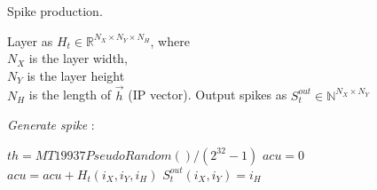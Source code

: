 \begin{algorithm}[h!]
	\label{alg:spike}
	\caption{Spike production.}
	
	\begin{algorithmic}[1]
		\SetAlgoLined
		\renewcommand{\algorithmicrequire}{\textbf{input:}}
		\renewcommand{\algorithmicensure}{\textbf{output:}}
		\REQUIRE Layer as $H_t\in\mathbb{R}^{N_X \times N_Y \times N_H}$, where\\
		$N_X$ is the layer width,\\
		$N_Y$ is the layer height\\
		$N_H$ is the length of $\vec{h}$ (IP vector).
		\ENSURE Output spikes as $S_t^{out} \in\mathbb{N}^{N_X \times N_Y}$
		
		
		
		\textit{Generate spike} :
		
		\STATE $th = MT19937PseudoRandom()/(2^{32}-1)$
		\STATE $acu = 0$
		\STATE $acu = acu + H_t(i_X,i_Y,i_{H})$
		\STATE $S_t^{out}(i_X,i_Y) = i_{H}$
		\ENDIF
		\ENDFOR
		\ENDFOR
	\end{algorithmic} 
\end{algorithm}





